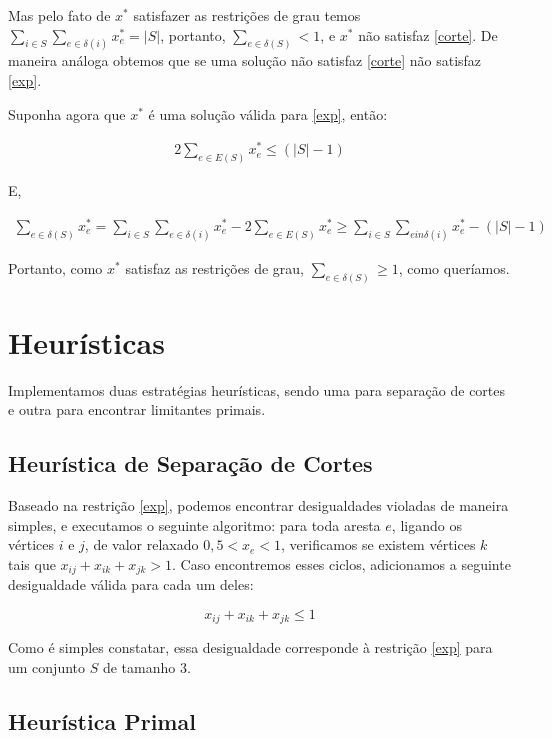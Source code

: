 \documentclass[11pt]{article}
\begin{document}
Mas pelo fato de $x^*$ satisfazer as restrições de grau temos $\sum_{i
  \in S}\sum_{e \in \delta (i)}x_e^* = |S|$, portanto, $\sum_{e \in
  \delta (S)} < 1$, e $x^*$ não satisfaz \eqref{corte}. De maneira
análoga obtemos que se uma solução não satisfaz \eqref{corte} não
satisfaz \eqref{exp}.

Suponha agora que $x^*$ é uma solução válida para \eqref{exp}, então:

\begin{align}
  2\sum_{e \in E(S)}x_e^* \le (|S| - 1)
\end{align}

E,

\begin{align}
  \sum_{e \in \delta (S)}x_e^* = \sum_{i \in S}\sum_{e \in \delta
    (i)}x_e^* - 2\sum_{e \in E(S)}x_e^* \ge \sum_{i \in S}\sum_{e in
    \delta (i)}x_e^* - (|S| - 1)
\end{align}

Portanto, como $x^*$ satisfaz as restrições de grau, $\sum_{e \in
  \delta (S)} \ge 1$, como queríamos.


\section{Heurísticas}

Implementamos duas estratégias heurísticas, sendo uma para separação de
cortes e outra para encontrar limitantes primais. 

\subsection{Heurística de Separação de Cortes}

Baseado na restrição \eqref{exp}, podemos encontrar desigualdades
violadas de maneira simples, e executamos o seguinte algoritmo: para
toda aresta $e$, ligando os vértices $i$ e $j$, de valor relaxado \( 0,5
< x_e < 1 \), verificamos se existem vértices $k$ tais que \( x_{ij} +
x_{ik} + x_{jk} > 1 \). Caso encontremos esses ciclos, adicionamos a
seguinte desigualdade válida para cada um deles: 

\begin{equation}
 x_{ij} + x_{ik} + x_{jk} \leq 1
\end{equation}

Como é simples constatar, essa desigualdade corresponde à restrição
\eqref{exp} para um conjunto $S$ de tamanho $3$. 

\subsection{Heurística Primal}
\end{document}
